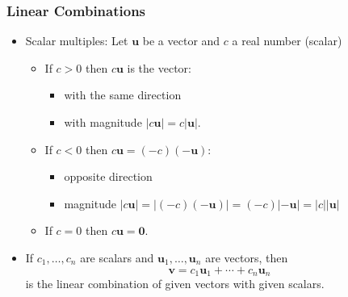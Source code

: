 \begin{frame}
 \frametitle{Linear Combinations}

\begin{itemize}
 \item Scalar multiples: Let $\textbf{u}$ be a vector and $c$ a real number (scalar)
  \begin{itemize}
    \item If $c >0$ then $c\textbf{u}$ is the vector: \pause
    \begin{itemize}
      \item with the same direction
      \item with magnitude $|c\textbf{u}| = c|\textbf{u}|$.
    \end{itemize}\pause
     \item If $c<0$ then $c\textbf{u} = (-c)(-\textbf{u})$: \pause
     \begin{itemize}
	\item opposite direction
	\item magnitude $|c\textbf{u}| = |(-c)(-\textbf{u})| = (-c)|-\textbf{u}| = |c||\textbf{u}|$
     \end{itemize}\pause
     \item If $c=0$ then \pause $c\textbf{u} = \textbf{0}$. \pause
  \end{itemize}
  \item If $c_1, \ldots , c_n$ are scalars and $\textbf{u}_1,\ldots,\textbf{u}_n$ are vectors, then
%
$$\textbf{v} = c_1\textbf{u}_1+ \dotsb + c_n \textbf{u}_n$$
%
is the linear combination of given vectors with given scalars.
\end{itemize}

\end{frame}
